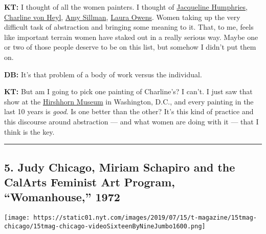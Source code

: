 \textbf{KT:} I thought of all the women painters. I thought of
\href{https://www.greenenaftaligallery.com/artists/jacqueline-humphries}{Jacqueline
Humphries},
\href{http://www.petzel.com/artists/charline-von-heyl}{Charline von
Heyl},
\href{https://www.nytimes.com/2013/09/29/arts/design/amy-sillman-brings-together-abstraction-and-figuration.html}{Amy
Sillman},
\href{https://www.nytimes.com/2017/09/04/t-magazine/art/ugly-painting-laura-owens-karen-kilimnik-sam-mckinniss.html}{Laura
Owens}. Women taking up the very difficult task of abstraction and
bringing some meaning to it. That, to me, feels like important terrain
women have staked out in a really serious way. Maybe one or two of those
people deserve to be on this list, but somehow I didn't put them on.

\textbf{DB:} It's that problem of a body of work versus the individual.

\textbf{KT:} But am I going to pick one painting of Charline's? I can't.
I just saw that show at the
\href{https://www.nytimes.com/2018/11/08/t-magazine/tino-sehgal-hirshhorn-museum-art.html}{Hirshhorn
Museum} in Washington, D.C., and every painting in the last 10 years is
\emph{good}. Is one better than the other? It's this kind of practice
and this discourse around abstraction --- and what women are doing with
it --- that I think is the key.

\begin{center}\rule{0.5\linewidth}{\linethickness}\end{center}

\hypertarget{5-judy-chicago-miriam-schapiro-and-the-calarts-feminist-art-program-womanhouse-1972}{%
\subsection{5. Judy Chicago, Miriam Schapiro and the CalArts Feminist
Art Program, ``Womanhouse,''
1972}\label{5-judy-chicago-miriam-schapiro-and-the-calarts-feminist-art-program-womanhouse-1972}}

\texttt{[image: https://static01.nyt.com/images/2019/07/15/t-magazine/15tmag-chicago/15tmag-chicago-videoSixteenByNineJumbo1600.png]}

